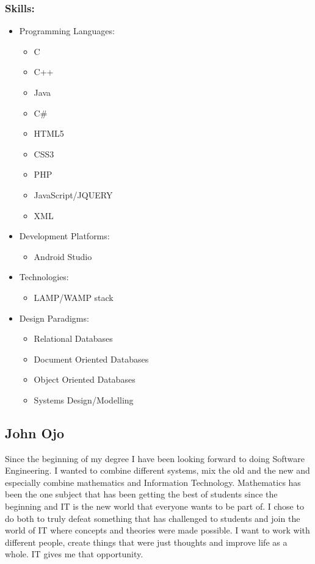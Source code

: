 \documentclass[12pt]{article}
\begin{document}
	
	\subsubsection{Skills:} 
	\begin{itemize}
	\item Programming Languages:
	\begin{itemize}
	\item C
	\item C++
	\item Java
	\item C\#
	\item HTML5
	\item CSS3
	\item PHP
	\item JavaScript/JQUERY
	\item XML
	\end{itemize}
	\item Development Platforms:
	\begin{itemize}
	\item Android Studio
	\end{itemize}
	\item Technologies:
	\begin{itemize}
	\item LAMP/WAMP stack
	\end{itemize}
	\item Design Paradigms:
	\begin{itemize}
	\item Relational Databases
	\item Document Oriented Databases
	\item Object Oriented Databases
	\item Systems Design/Modelling
	\end{itemize}
	\end{itemize}
	
	\subsection{John Ojo}
	Since the beginning of my degree I have been looking forward to doing Software Engineering. I wanted to combine different systems, mix the old and the new and especially combine mathematics and Information Technology. Mathematics has been the one subject that has been getting the best of students since the beginning and IT is the new world that everyone wants to be part of. I chose to do both to truly defeat something that has challenged to students and join the world of IT where concepts and theories were made possible. I want to work with different people, create things that were just thoughts and improve life as a whole. IT gives me that opportunity.
\end{document}
